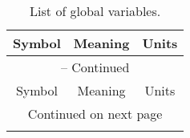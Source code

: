 \begin{center}
\begin{longtable}{cp{7cm}c}
\caption{List of global variables.} \label{table:flow-list-of-variables} \\

\multicolumn{1}{c}{Symbol} & \multicolumn{1}{c}{Meaning} & \multicolumn{1}{c}{Units} \\
\hline  \hline 
\endfirsthead

\multicolumn{3}{c}{{\tablename} \thetable{} -- Continued} \\
\multicolumn{1}{c}{Symbol} & \multicolumn{1}{c}{Meaning} & \multicolumn{1}{c}{Units} \\
\hline  \hline 
\endhead

\hline \multicolumn{3}{c}{{Continued on next page}} \\ 
\hline \hline 
\endfoot

\hline \hline
\endlastfoot


\end{longtable}
\end{center}
